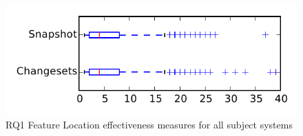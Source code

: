 
\begin{figure}
\centering
\includegraphics[height=0.4\textheight]{figures/flt/rq1_tiny}
\caption{RQ1 Feature Location effectiveness measures for all subject systems}
\label{fig:flt:rq1:tiny}
\end{figure}
